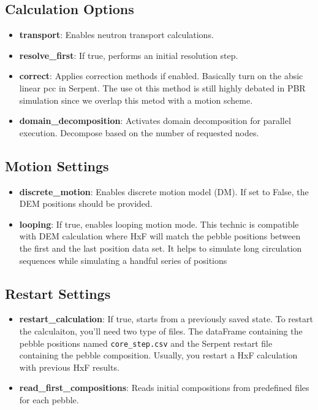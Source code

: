 \documentclass{article}
\begin{document}
\subsection{Calculation Options}
\begin{itemize}
    \item \textbf{transport}: Enables neutron transport calculations.
    \item \textbf{resolve\_first}: If true, performs an initial resolution step.
    \item \textbf{correct}: Applies correction methods if enabled. Basically turn on the absic linear pcc in Serpent. The use ot this method is still highly debated in PBR simulation since we overlap this metod with a motion scheme.
    \item \textbf{domain\_decomposition}: Activates domain decomposition for parallel execution. Decompose based on the number of requested nodes.
\end{itemize}

\subsection{Motion Settings}
\begin{itemize}
    \item \textbf{discrete\_motion}: Enables discrete motion model (DM). If set to False, the DEM positions should be provided.
    \item \textbf{looping}: If true, enables looping motion mode. This technic is compatible with DEM calculation where HxF will match the pebble positions between the first and the last position data set. It helps to simulate long circulation sequences while simulating a handful series of positions 
\end{itemize}

\subsection{Restart Settings}
\begin{itemize}
    \item \textbf{restart\_calculation}: If true, starts from a previously saved state. To restart the calculaiton, you'll need two type of files. The dataFrame containing the pebble positions named \texttt{core\_step.csv} and the Serpent restart file containing the pebble composition. Usually, you restart a HxF calculation with previous HxF results.
    \item \textbf{read\_first\_compositions}: Reads initial compositions from predefined files for each pebble.
\end{itemize}
\end{document}
